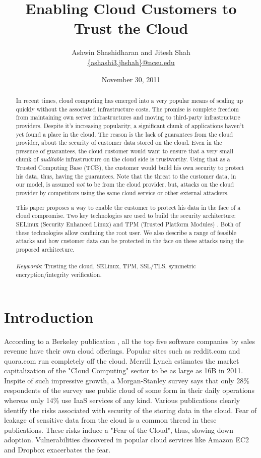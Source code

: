 \documentclass[10pt,twocolumn,pdftex]{article}
\title{Enabling Cloud Customers to Trust the Cloud}
\author{Ashwin Shashidharan and Jitesh Shah \\
\url{{ashashi3,jhshah}@ncsu.edu}
}
\date{November 30, 2011}
\begin{document}
\maketitle

\begin{abstract}
In recent times, cloud computing has emerged into a very popular \cite{adoption-survey} means of scaling up quickly without the associated infrastructure costs. The promise is complete freedom from maintaining own server infrastructures and moving to third-party infrastructure providers. Despite it's increasing popularity, a significant chunk of applications haven't yet found a place in the cloud. The reason is the lack of guarantees from the cloud provider, about the security of customer data stored on the cloud. Even in the presence of guarantees, the cloud customer would want to ensure that a very small chunk of \emph{auditable} infrastructure on the cloud side is trustworthy. Using that as a Trusted Computing Base (TCB), the customer would build his own security to protect his data, thus, having the guarantees. Note that the threat to the customer data, in our model, is assumed \emph{not} to be from the cloud provider, but, attacks on the cloud provider by competitors using the same cloud service or other external attackers. 

This paper proposes a way to enable the customer to protect his data in the face of a cloud compromise. Two key technologies are used to build the security architecture: SELinux (Security Enhanced Linux) \cite{SELinux} and TPM (Trusted Platform Modules) \cite{TCG}. Both of these technologies allow confining the root user. We also describe a range of feasible attacks and how customer data can be protected in the face on these attacks using the proposed architecture.\\ \\
\emph{Keywords}:  Trusting the cloud, SELinux, TPM, SSL/TLS, symmetric encryption/integrity verification.
\end{abstract}

\section{Introduction}
According to a Berkeley publication \cite{controlling-data-in-the-cloud}, all the top five software companies by sales revenue have their own cloud offerings. Popular sites such as reddit.com and quora.com run completely off the cloud. Merrill Lynch estimates the market capitalization of the "Cloud Computing" sector to be as large as 16B in 2011. Inspite of such impressive growth, a Morgan-Stanley survey \cite{morgan-stanley} says that only 28\% respondents of the survey use public cloud of some form in their daily operations whereas only 14\% use IaaS services of any kind. Various publications \cite{controlling-data-in-the-cloud, ENISA} clearly identify the risks associated with security of the storing data in the cloud. Fear of leakage of sensitive data from the cloud is a common thread in these publications. These risks induce a "Fear of the Cloud", thus, slowing down adoption. Vulnerabilities discovered in popular cloud services like Amazon EC2 \cite{amazon-ec2-vulnerability} and Dropbox \cite{dropbox-vulnerability} exacerbates the fear. 
\end{document}
